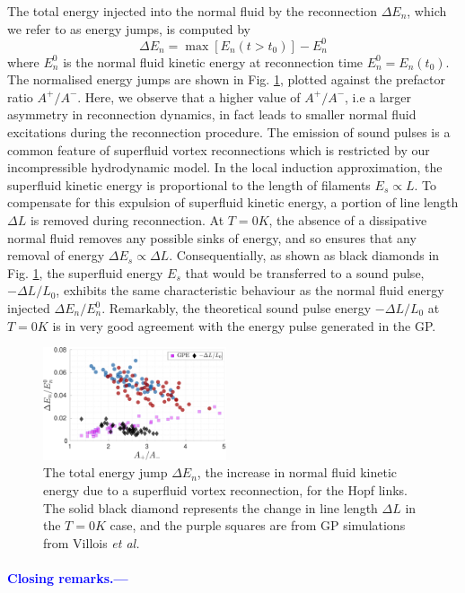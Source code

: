 \documentclass[%
 reprint,
 amsmath,amssymb,
 aps,
 prl,
]{revtex4-2}
\newcommand{\etal}{{\it et al.}~}
\def\blue#1{\textcolor{blue}{#1}}
\begin{document}
The total energy injected into the normal fluid by the reconnection $\Delta E_n$, which we refer to as energy jumps, is computed by 
\begin{equation}
	\Delta E_n = \max{\left[E_n(t>t_0)\right]} - E_n^0
\end{equation} 
where $E_n^0$ is the normal fluid kinetic energy at reconnection time $E_n^0=E_n(t_0)$. The normalised energy jumps are shown in Fig. \ref{fig: energy-jumps}, plotted against the prefactor ratio $A^+/A^-$. Here, we observe that a higher value of $A^+/A^-$, i.e a larger asymmetry in reconnection dynamics, in fact leads to smaller normal fluid excitations during the reconnection procedure. The emission of sound pulses is a common feature of superfluid vortex reconnections \cite{leadbeaterSoundEmissionDue2001b} which is restricted by our incompressible hydrodynamic model. In the local induction approximation, the superfluid kinetic energy is proportional to the length of filaments $E_s\propto L$. To compensate for this expulsion of superfluid kinetic energy, a portion of line length $\Delta L$ is removed during reconnection. At $T=0K$, the absence of a dissipative normal fluid removes any possible sinks of energy, and so ensures that any removal of energy $\Delta E_s\propto \Delta L$. Consequentially, as shown as black diamonds in Fig. \ref{fig: energy-jumps}, the superfluid energy $E_s$ that would be transferred to a sound pulse, $-\Delta L/L_0$, exhibits the same characteristic behaviour as the normal fluid energy injected $\Delta E_n/E_n^0$. Remarkably, the theoretical sound pulse energy $-\Delta L/L_0$ at $T=0K$ is in very good agreement with the energy pulse generated in the GP. 

\begin{figure}
	\centering
	\includegraphics*[width=0.48\textwidth]{energy-jump.pdf}
	\caption{The total energy jump $\Delta E_n$, the increase in normal fluid kinetic energy due to a superfluid vortex reconnection, for the Hopf links. The solid black diamond represents the change in line length $\Delta L$ in the $T=0K$ case, and the purple squares are from GP simulations from Villois \etal \cite{villoisIrreversibleDynamicsVortex2020}}
	\label{fig: energy-jumps}
\end{figure}

\blue{
\paragraph*{Closing remarks.---}
}

\end{document}
